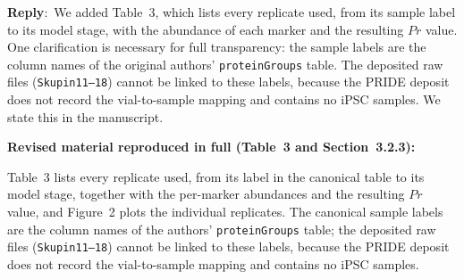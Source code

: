 \documentclass[11pt]{article}
\newcommand{\reply}{\medskip \noindent \textbf{Reply}:\ }
\newcommand{\revisedheading}[1]{\medskip\noindent\textbf{Revised material
  reproduced in full (#1):}\par}
\newenvironment{revised}{\par\color{red}}{\par}
\begin{document}
\reply{We added Table~3, which lists every replicate used, from its sample label to its model stage, with the abundance of each marker and the resulting $Pr$ value. One clarification is necessary for full transparency: the sample labels are the column names of the original authors' \texttt{proteinGroups} table. The deposited raw files (\texttt{Skupin11--18}) cannot be linked to these labels, because the PRIDE deposit does not record the vial-to-sample mapping and contains no iPSC samples. We state this in the manuscript.}

\revisedheading{Table~3 and Section~3.2.3}
\begin{table}[!htbp]
\centering
\caption{\textcolor{red}{Table~3 of the revised manuscript. Canonical CTRL proteomic replicates: sample label, stage assignment, number of replicates $n$ in the stage, per-marker abundance ($\log_{2}(1+\text{LFQ})$; n.q.\ = not quantified, LFQ $= 0$, entering Eq.~5 as 0), and the replicate-level proteomic score $Pr$ (Eq.~5).}}
\color{red}
\end{table}
\begin{revised}
Table~3 lists every replicate used, from its label in the canonical table to its model stage, together with the per-marker abundances and the resulting $Pr$ value, and Figure~2 plots the individual replicates. The canonical sample labels are the column names of the authors' \texttt{proteinGroups} table; the deposited raw files (\texttt{Skupin11--18}) cannot be linked to these labels, because the PRIDE deposit does not record the vial-to-sample mapping and contains no iPSC samples.
\end{revised}
\end{document}
